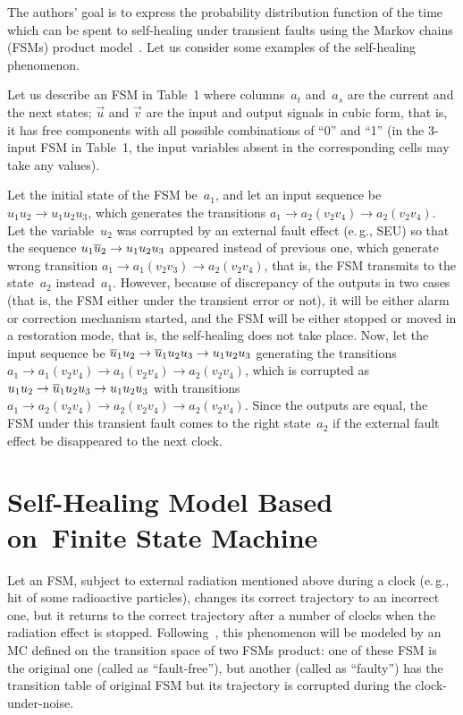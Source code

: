 \begin{multicols}{2}
\bigskip


The authors' goal is to  express  the  probability
distribution function of the  time which can be spent
to  self-healing  under transient faults  using the
Markov chains (FSMs) product model~\cite{7fr, 8fr}.
Let us consider some examples of the self-healing
phenomenon.

Let us describe an FSM in Table~1 where columns~$a_t$
and~$a_s$  are the current and the next states;
$\vec u$ and $\vec v$ are the input and output signals in cubic
form, that is, it has free components with all
possible combinations of ``0'' and ``1''
(in the 3-input FSM in Table~1, the input variables
absent in the corresponding cells may take any
values).


Let the initial state of the FSM be~$a_1$, and let an
input sequence be $u_1u_2\to u_1u_2u_3$, which generates
the transitions $a_1\to a_2(v_2v_4)\to a_2(v_2v_4)$.
Let the variable~$u_2$ was corrupted by an external
fault effect (e.\,g., SEU) so that the sequence
$u_1\overline u_2\to u_1u_2u_3$ appeared instead of previous
one, which generate wrong transition
$a_1\to a_1(v_2v_3)\to a_2(v_2v_4)$, that is, the FSM
transmits to the state~$a_2$ instead~$a_1$.
However, because of discrepancy of the outputs in
two cases (that is, the FSM either under the transient
error or not), it will be  either alarm or correction
mechanism  started, and the FSM will be either
stopped or moved in a restoration mode, that is, the
self-healing does not take place.
Now, let the input sequence be
$\overline u_1u_2\to \overline u_1u_2u_3\to u_1u_2u_3$ generating the
transitions
$a_1\to a_1(v_2v_4)\to a_1(v_2v_4)\to a_2(v_2v_4)$,
which is corrupted as
$u_1u_2\to \overline u_1u_2u_3\to u_1u_2u_3$ with
transitions
$a_1\to a_2(v_2v_4)\to a_2(v_2v_4)\to a_2(v_2v_4)$.
Since the outputs are equal, the FSM under this
transient fault comes to the right state~$a_2$
if the external fault effect be disappeared to
the next clock.

\section{Self-Healing Model Based on~Finite State Machine}

\noindent
Let an FSM, subject to external radiation mentioned
above during a clock (e.\,g., hit of some radioactive
particles), changes its correct trajectory to an
incorrect one, but it returns to the correct trajectory
after a number of clocks when the radiation effect is
stopped.
Following~\cite{7fr}, this phenomenon will be modeled by an
MC defined on the transition space of
two FSMs product: one of these FSM is the original one
(called as ``fault-free''), but another (called as
``faulty'') has the transition table of original
FSM but its trajectory is corrupted during the
clock-under-noise.


\end{multicols}
